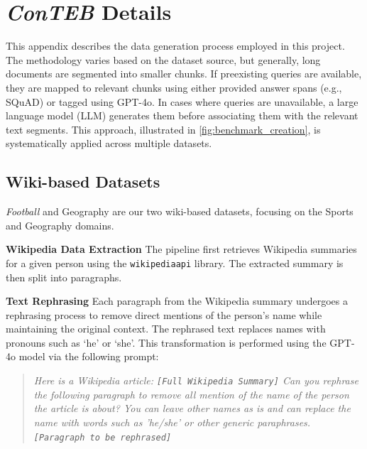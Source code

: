 \section{\textit{ConTEB} Details}\label{app:conteb_stats}




This appendix describes the data generation process employed in this project. The methodology varies based on the dataset source, but generally, long documents are segmented into smaller chunks. If preexisting queries are available, they are mapped to relevant chunks using either provided answer spans (e.g., SQuAD) or tagged using GPT-4o. In cases where queries are unavailable, a large language model (LLM) generates them before associating them with the relevant text segments. This approach, illustrated in \ref{fig:benchmark_creation}, is systematically applied across multiple datasets.


\subsection{Wiki-based Datasets} \label{app:wiki-based}

\emph{Football} and Geography are our two wiki-based datasets, focusing on the Sports and Geography domains.

\noindent\textbf{Wikipedia Data Extraction}
The pipeline first retrieves Wikipedia summaries for a given person using the \texttt{wikipediaapi} library. The extracted summary is then split into paragraphs.

\noindent\textbf{Text Rephrasing}
Each paragraph from the Wikipedia summary undergoes a rephrasing process to remove direct mentions of the person’s name while maintaining the original context. The rephrased text replaces names with pronouns such as ‘he’ or ‘she’. This transformation is performed using the GPT-4o model via the following prompt:

\begin{quote}
\textit{
Here is a Wikipedia article:
\texttt{[Full Wikipedia Summary]}
Can you rephrase the following paragraph to remove all mention of the name of the person the article is about? You can leave other names as is and can replace the name with words such as 'he/she' or other generic paraphrases.
\texttt{[Paragraph to be rephrased]}
}
\end{quote}


